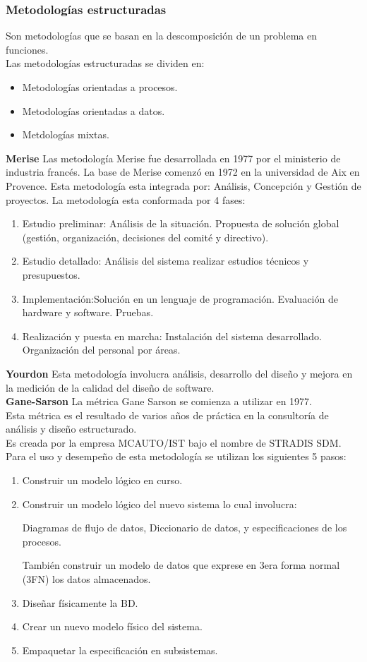\documentclass[12pt,twoside]{article}
\begin{document}
\subsubsection{Metodologías estructuradas}
Son metodologías que se basan en la descomposición de un problema en funciones.\\
Las metodologías estructuradas se dividen en:
\begin{itemize}
    \item Metodologías orientadas a procesos.
    \item Metodologías orientadas a datos.
    \item Metdologías mixtas.
\end{itemize}
\textbf{Merise}
Las metodología Merise fue desarrollada en 1977 por el ministerio de industria francés.
La base de Merise comenzó en 1972 en la universidad de Aix en Provence.
Esta metodología esta integrada por: Análisis, Concepción y Gestión de proyectos.
La metodología esta conformada por 4 fases:
\begin{enumerate}
    \item Estudio preliminar: Análisis de la situación.
    Propuesta de solución global (gestión, organización, decisiones del comité y directivo).
    \item Estudio detallado: Análisis del sistema realizar estudios técnicos y presupuestos.
    \item Implementación:Solución en un lenguaje de programación.
    Evaluación de hardware y software.
    Pruebas.
    \item Realización y puesta en marcha: Instalación del sistema desarrollado.
    Organización del personal por áreas.
\end{enumerate}
\textbf{Yourdon}
Esta metodología involucra análisis, desarrollo del diseño y mejora en la medición de la calidad 
del diseño de software.\\
\textbf{Gane-Sarson}
La métrica Gane Sarson se comienza a utilizar en 1977.\\
Esta métrica es el resultado de varios años de práctica en la consultoría de análisis y diseño 
estructurado.\\
Es creada por la empresa MCAUTO/IST bajo el nombre de STRADIS SDM.\\
Para el uso y desempeño de esta metodología se utilizan los siguientes 5 pasos:
\begin{enumerate}
    \item Construir un modelo lógico en curso.
    \item Construir un modelo lógico del nuevo sistema lo cual involucra:
    
    Diagramas de flujo de datos, Diccionario de datos, y especificaciones de los procesos.

    También construir un modelo de datos que exprese en 3era forma normal (3FN) los datos
    almacenados.
    \item Diseñar físicamente la BD.
    \item Crear un nuevo modelo físico del sistema.
    \item Empaquetar la especificación en subsistemas. 
\end{enumerate}
\end{document}
